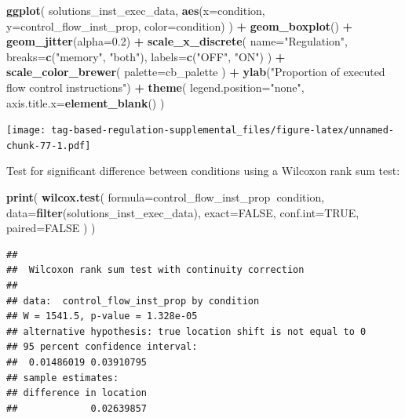 \documentclass[]{book}
\newenvironment{Shaded}{\begin{snugshade}}{\end{snugshade}}
\newcommand{\DataTypeTok}[1]{\textcolor[rgb]{0.13,0.29,0.53}{#1}}
\newcommand{\FloatTok}[1]{\textcolor[rgb]{0.00,0.00,0.81}{#1}}
\newcommand{\KeywordTok}[1]{\textcolor[rgb]{0.13,0.29,0.53}{\textbf{#1}}}
\newcommand{\NormalTok}[1]{#1}
\newcommand{\OperatorTok}[1]{\textcolor[rgb]{0.81,0.36,0.00}{\textbf{#1}}}
\newcommand{\OtherTok}[1]{\textcolor[rgb]{0.56,0.35,0.01}{#1}}
\newcommand{\StringTok}[1]{\textcolor[rgb]{0.31,0.60,0.02}{#1}}
\begin{document}
\begin{Shaded}
\begin{Highlighting}[]
\KeywordTok{ggplot}\NormalTok{( solutions_inst_exec_data, }\KeywordTok{aes}\NormalTok{(}\DataTypeTok{x=}\NormalTok{condition, }\DataTypeTok{y=}\NormalTok{control_flow_inst_prop, }\DataTypeTok{color=}\NormalTok{condition) ) }\OperatorTok{+}
\StringTok{  }\KeywordTok{geom_boxplot}\NormalTok{() }\OperatorTok{+}
\StringTok{  }\KeywordTok{geom_jitter}\NormalTok{(}\DataTypeTok{alpha=}\FloatTok{0.2}\NormalTok{) }\OperatorTok{+}
\StringTok{  }\KeywordTok{scale_x_discrete}\NormalTok{(}
    \DataTypeTok{name=}\StringTok{"Regulation"}\NormalTok{,}
    \DataTypeTok{breaks=}\KeywordTok{c}\NormalTok{(}\StringTok{"memory"}\NormalTok{, }\StringTok{"both"}\NormalTok{),}
    \DataTypeTok{labels=}\KeywordTok{c}\NormalTok{(}\StringTok{"OFF"}\NormalTok{, }\StringTok{"ON"}\NormalTok{)}
\NormalTok{  ) }\OperatorTok{+}
\StringTok{  }\KeywordTok{scale_color_brewer}\NormalTok{(}
    \DataTypeTok{palette=}\NormalTok{cb_palette}
\NormalTok{  ) }\OperatorTok{+}
\StringTok{  }\KeywordTok{ylab}\NormalTok{(}\StringTok{"Proportion of executed flow control instructions"}\NormalTok{) }\OperatorTok{+}
\StringTok{  }\KeywordTok{theme}\NormalTok{(}
    \DataTypeTok{legend.position=}\StringTok{"none"}\NormalTok{,}
    \DataTypeTok{axis.title.x=}\KeywordTok{element_blank}\NormalTok{()}
\NormalTok{  )}
\end{Highlighting}
\end{Shaded}

\texttt{[image: tag-based-regulation-supplemental\_files/figure-latex/unnamed-chunk-77-1.pdf]}

Test for significant difference between conditions using a Wilcoxon rank sum test:

\begin{Shaded}
\begin{Highlighting}[]
\KeywordTok{print}\NormalTok{(}
  \KeywordTok{wilcox.test}\NormalTok{(}
    \DataTypeTok{formula=}\NormalTok{control_flow_inst_prop}\OperatorTok{~}\NormalTok{condition,}
    \DataTypeTok{data=}\KeywordTok{filter}\NormalTok{(solutions_inst_exec_data),}
    \DataTypeTok{exact=}\OtherTok{FALSE}\NormalTok{,}
    \DataTypeTok{conf.int=}\OtherTok{TRUE}\NormalTok{,}
    \DataTypeTok{paired=}\OtherTok{FALSE}
\NormalTok{  )}
\NormalTok{)}
\end{Highlighting}
\end{Shaded}

\begin{verbatim}
## 
##  Wilcoxon rank sum test with continuity correction
## 
## data:  control_flow_inst_prop by condition
## W = 1541.5, p-value = 1.328e-05
## alternative hypothesis: true location shift is not equal to 0
## 95 percent confidence interval:
##  0.01486019 0.03910795
## sample estimates:
## difference in location 
##             0.02639857
\end{verbatim}
\end{document}
